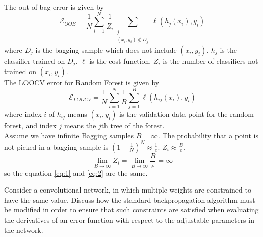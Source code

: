 \documentclass[a4 paper]{article}
\begin{document}
The out-of-bag error is given by
\begin{equation}\label{eq:1}
    \mathcal{E}_{OOB} = \frac{1}{N} \sum_{i=1}^N \frac{1}{Z_i} \sum_{\substack{j \\ (x_i, y_i) \notin D_j}} \ell(h_j(x_i), y_i)
\end{equation}
where $D_j$ is the bagging sample which does not include $(x_i, y_i)$. $h_j$ is the classifier trained on $D_j$. $\ell$ is the cost function. $Z_i$ is the number of classifiers not trained on $(x_i, y_i)$.\\
The LOOCV error for Random Forest is given by
\begin{equation}\label{eq:2}
    \mathcal{E}_{LOOCV} = \frac{1}{N} \sum_{i=1}^N \frac{1}{B} \sum_{j=1}^B \ell(h_{ij}(x_i), y_i)
\end{equation}
where index $i$ of $h_{ij}$ means $(x_i, y_i)$ is the validation data point for the random forest, and index $j$ means the $j$th tree of the forest.\\
Assume we have infinite Bagging samples $B=\infty$. The probability that a point is not picked in a bagging sample is $(1-\frac{1}{N})^N \approx \frac{1}{e}$. $Z_i \approx \frac{B}{e}$.
\begin{equation}
    \lim_{B\to\infty} Z_i = \lim_{B\to\infty} \frac{B}{e} = \infty
\end{equation}
so the equation \ref{eq:1} and \ref{eq:2} are the same.


 Consider a convolutional network, in which multiple weights are constrained to have the same value. Discuss how the standard backpropagation algorithm must be modified in order to ensure that such constraints are satisfied when evaluating the derivatives of an error function with respect to the adjustable parameters in the network.\\
\end{document}

